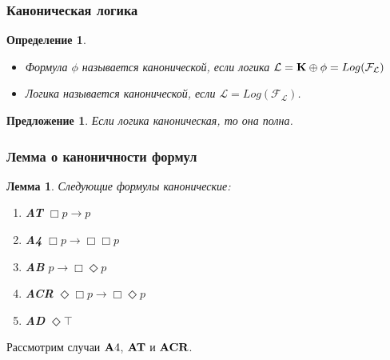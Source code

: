 \documentclass[pdf,utf8,russian,aspectratio=169]{beamer}
\newtheorem{defin}{Определение}
\newtheorem{lem}{Лемма}
\newtheorem{prop}{Предложение}
\begin{document}
\begin{frame}
  \frametitle{Каноническая логика}

  \begin{defin}
    \begin{itemize}
    \item Формула $\phi$ называется канонической, если логика $\mathcal{L} = {\bf K} \oplus \phi = Log(\mathcal{F}_{\mathcal{L}})$
    \item Логика называется канонической, если $\mathcal{L} = Log(\mathcal{F}_{\mathcal{L}})$.
  \end{itemize}
  \end{defin}

  \begin{prop}
    Если логика каноническая, то она полна.
  \end{prop}
\end{frame}


\begin{frame}
  \frametitle{Лемма о каноничности формул}
  \begin{lem}
    Следующие формулы канонические:
    \begin{enumerate}
      \item {\bf AT} $\Box p \to p$
      \item {\bf A4} $\Box p \to \Box \Box p$
      \item {\bf AB} $p \to \Box \Diamond p$
      \item {\bf ACR} $\Diamond \Box p \to \Box \Diamond p$
      \item {\bf AD} $\Diamond \top$
    \end{enumerate}
  \end{lem}

  Рассмотрим случаи ${\bf A}4$, ${\bf AT}$ и ${\bf ACR}$.
\end{frame}
\end{document}
